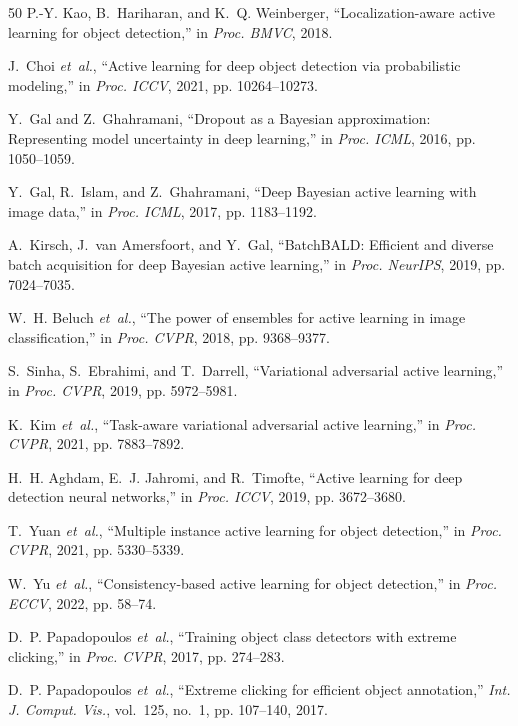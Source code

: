 \documentclass[conference]{IEEEtran}
\begin{document}
\begin{thebibliography}{50}
P.-Y. Kao, B.~Hariharan, and K.~Q. Weinberger, ``Localization-aware active learning for object detection,'' in \emph{Proc. BMVC}, 2018.

J.~Choi \emph{et~al.}, ``Active learning for deep object detection via probabilistic modeling,'' in \emph{Proc. ICCV}, 2021, pp. 10264--10273.

Y.~Gal and Z.~Ghahramani, ``Dropout as a Bayesian approximation: Representing model uncertainty in deep learning,'' in \emph{Proc. ICML}, 2016, pp. 1050--1059.

Y.~Gal, R.~Islam, and Z.~Ghahramani, ``Deep Bayesian active learning with image data,'' in \emph{Proc. ICML}, 2017, pp. 1183--1192.

A.~Kirsch, J.~van Amersfoort, and Y.~Gal, ``BatchBALD: Efficient and diverse batch acquisition for deep Bayesian active learning,'' in \emph{Proc. NeurIPS}, 2019, pp. 7024--7035.

W.~H. Beluch \emph{et~al.}, ``The power of ensembles for active learning in image classification,'' in \emph{Proc. CVPR}, 2018, pp. 9368--9377.

S.~Sinha, S.~Ebrahimi, and T.~Darrell, ``Variational adversarial active learning,'' in \emph{Proc. CVPR}, 2019, pp. 5972--5981.

K.~Kim \emph{et~al.}, ``Task-aware variational adversarial active learning,'' in \emph{Proc. CVPR}, 2021, pp. 7883--7892.

H.~H. Aghdam, E.~J. Jahromi, and R.~Timofte, ``Active learning for deep detection neural networks,'' in \emph{Proc. ICCV}, 2019, pp. 3672--3680.

T.~Yuan \emph{et~al.}, ``Multiple instance active learning for object detection,'' in \emph{Proc. CVPR}, 2021, pp. 5330--5339.

W.~Yu \emph{et~al.}, ``Consistency-based active learning for object detection,'' in \emph{Proc. ECCV}, 2022, pp. 58--74.

D.~P. Papadopoulos \emph{et~al.}, ``Training object class detectors with extreme clicking,'' in \emph{Proc. CVPR}, 2017, pp. 274--283.

D.~P. Papadopoulos \emph{et~al.}, ``Extreme clicking for efficient object annotation,'' \emph{Int. J. Comput. Vis.}, vol.~125, no.~1, pp. 107--140, 2017.


\end{thebibliography}
\end{document}
